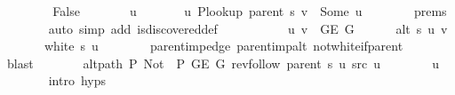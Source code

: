 \begin{isabellebody}
\ \ \isamarkupfalse%
\isanewline
\ \ \ \ \isamarkupfalse%
\ False\isanewline
\ \ \ \ \isamarkupfalse%
\ \isamarkupfalse%
\ u\ \isanewline
\ \ \ \ \ \ u{\isacharcolon}{\kern0pt}\ {\isachardoublequoteopen}P{\isacharunderscore}{\kern0pt}lookup\ {\isacharparenleft}{\kern0pt}parent\ s{\isacharparenright}{\kern0pt}\ v\ {\isacharequal}{\kern0pt}\ Some\ u{\isachardoublequoteclose}\isanewline
\ \ \ \ \ \ \isamarkupfalse%
\ {\isachardoublequoteopen}{}{\isachardot}{\kern0pt}prems{\isachardoublequoteclose}\isanewline
\ \ \ \ \ \ \isamarkupfalse%
\ {\isacharparenleft}{\kern0pt}auto\ simp\ add{\isacharcolon}{\kern0pt}\ is{\isacharunderscore}{\kern0pt}discovered{\isacharunderscore}{\kern0pt}def{\isacharparenright}{\kern0pt}\isanewline
\ \ \ \ \isamarkupfalse%
\isanewline
\ \ \ \ \ \ {\isachardoublequoteopen}{\isacharbraceleft}{\kern0pt}u{\isacharcomma}{\kern0pt}\ v{\isacharbraceright}{\kern0pt}\ {\isasymin}\ G{\isachardot}{\kern0pt}E\ G{\isachardoublequoteclose}\isanewline
\ \ \ \ \ \ {\isachardoublequoteopen}alt\ s\ u\ v{\isachardoublequoteclose}\isanewline
\ \ \ \ \ \ {\isachardoublequoteopen}{\isasymnot}\ white\ s\ u{\isachardoublequoteclose}\isanewline
\ \ \ \ \ \ \isamarkupfalse%
\ parent{\isacharunderscore}{\kern0pt}imp{\isacharunderscore}{\kern0pt}edge\ parent{\isacharunderscore}{\kern0pt}imp{\isacharunderscore}{\kern0pt}alt\ not{\isacharunderscore}{\kern0pt}white{\isacharunderscore}{\kern0pt}if{\isacharunderscore}{\kern0pt}parent\isanewline
\ \ \ \ \ \ \isamarkupfalse%
\ blast{\isacharplus}{\kern0pt}\isanewline
\ \ \ \ \isamarkupfalse%
\ \isamarkupfalse%
\ {\isachardoublequoteopen}alt{\isacharunderscore}{\kern0pt}path\ P{\isacharprime}{\kern0pt}{\isacharprime}{\kern0pt}\ {\isacharparenleft}{\kern0pt}Not\ {\isasymcirc}\ P{\isacharprime}{\kern0pt}{\isacharprime}{\kern0pt}{\isacharparenright}{\kern0pt}\ {\isacharparenleft}{\kern0pt}G{\isachardot}{\kern0pt}E\ G{\isacharparenright}{\kern0pt}\ {\isacharparenleft}{\kern0pt}rev{\isacharunderscore}{\kern0pt}follow\ {\isacharparenleft}{\kern0pt}parent\ s{\isacharparenright}{\kern0pt}\ u{\isacharparenright}{\kern0pt}\ src\ u{\isachardoublequoteclose}\isanewline
\ \ \ \ \ \ \isamarkupfalse%
\ u\isanewline
\ \ \ \ \ \ \isamarkupfalse%
\ {\isacharparenleft}{\kern0pt}intro\ {\isachardoublequoteopen}{}{\isachardot}{\kern0pt}hyps{\isachardoublequoteclose}{\isacharparenright}{\kern0pt}\isanewline

\end{isabellebody}
